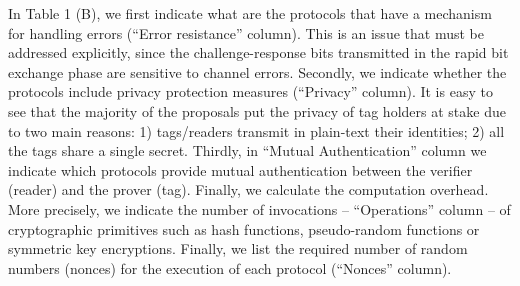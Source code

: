 \documentclass{article}
\begin{document}
In Table 1 (B), we first indicate what are the protocols that have a mechanism for handling errors (``Error resistance'' column). This is an issue that must be addressed explicitly, since the challenge-response bits transmitted in the rapid bit exchange phase are sensitive to channel errors. Secondly, we indicate whether the protocols include privacy protection measures (``Privacy'' column). It is easy to see that the majority of the proposals put the privacy of tag holders at stake due to two main reasons: 1) tags/readers transmit in plain-text their identities; 2)  all the tags share a single secret. Thirdly, in ``Mutual Authentication'' column we indicate which protocols provide mutual authentication between the verifier (reader) and the prover (tag). Finally, we calculate the computation overhead. More precisely, we indicate the number of invocations -- ``Operations'' column -- of cryptographic primitives such as hash functions, pseudo-random functions or symmetric key encryptions. Finally, we list the required number of random numbers (nonces) for the execution of each protocol (``Nonces'' column).
\end{document}
